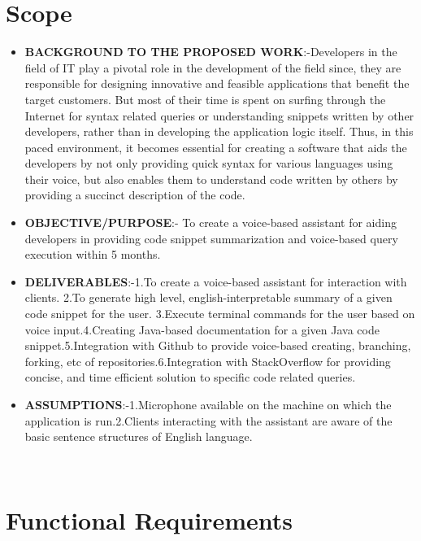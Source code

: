 \documentclass[oneside,a4paper,12pt, times]{book}
\begin{document}
\section{Scope}
\begin{itemize}
\item \textbf{BACKGROUND TO THE PROPOSED WORK}:-\newline Developers in the field of IT play a pivotal role in the development of the field since, they are responsible for designing innovative and feasible applications that benefit the target customers. But most of their time is spent on surfing through the Internet for syntax related queries or understanding snippets written by other developers, rather than in developing the application logic itself. Thus, in this paced environment, it becomes essential for creating a software that aids the developers by not only providing quick syntax for various languages using their voice, but also enables them to understand code written by others by providing a succinct description of the code. 
\item \textbf{OBJECTIVE/PURPOSE}:- \newline To create a voice-based assistant for aiding developers in providing code snippet summarization and voice-based query execution within 5 months.   
\item \textbf{DELIVERABLES}:-\newline1.To create a voice-based assistant for interaction with clients. \newline2.To generate high level, english-interpretable summary of a given code snippet for the user. \newline3.Execute terminal commands for the user based on voice input.\newline4.Creating Java-based documentation for a given Java code snippet.\newline5.Integration with Github to provide voice-based creating, branching, forking, etc of repositories.\newline 6.Integration with StackOverflow for providing concise, and time efficient solution to specific code related queries.
\item \textbf{ASSUMPTIONS}:-\newline1.Microphone available on the machine on which the application is run.\newline2.Clients interacting with the assistant are aware of the basic sentence structures of English language.
\end{itemize}
\\



\section{Functional Requirements}  
\end{document}

